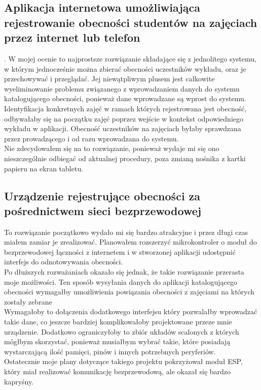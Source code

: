 \documentclass[declaration,shortabstract, mgr]{iithesis}
\begin{document}
\subsection{Aplikacja internetowa umożliwiająca rejestrowanie obecności studentów na zajęciach przez internet lub telefon}. 
\indent W mojej ocenie to najprostsze rozwiązanie składające się z jednolitego systemu, w którym jednocześnie można zbierać obecności uczestników wykładu, oraz je przechowywać i przeglądać. Jej niewątpliwym plusem jest całkowite wyeliminowanie problemu związanego z wprowadzaniem danych do systemu katalogującego obecności, ponieważ dane wprowadzane są wprost do systemu. Identyfikacja konkretnych zajęć w ramach których rejestrowana jest obecność, odbywałaby się na początku zajęć poprzez wejście w kontekst odpowiedniego wykładu w aplikacji. Obecność uczestników na zajęciach byłaby sprawdzana przez prowadzącego i od razu wprowadzana do systemu. \\
\indent Nie zdecydowałem się na to rozwiązanie, ponieważ wydaje mi się ono nieszczególnie odbiegać od aktualnej procedury, poza zmianą nośnika z kartki papieru na ekran tabletu.

\subsection{Urządzenie rejestrujące obecności za pośrednictwem sieci bezprzewodowej}
\indent To rozwiązanie początkowo wydało mi się bardzo atrakcyjne i przez długi czas miałem zamiar je zrealizować. Planowałem rozszerzyć mikrokontroler o moduł do bezprzewodowej łączności z internetem i w stworzonej aplikacji udostępnić interfejs do odnotowywania obecności. \\
\indent Po dłuższych rozważaniach okazało się jednak, że takie rozwiązanie przerasta moje możliwości. Ten sposób wysyłania danych do aplikacji katalogującego obecności wymagałby umożliwienia powiązania obecności z zajęciami na których zostały zebrane \\
\indent Wymagałoby to dołączenia dodatkowego interfejsu który pozwalałby wprowadzać takie dane, co jeszcze bardziej komplikowałoby projektowane przeze mnie urządzenie. Dodatkowo ograniczyłoby to zbiór układów scalonych z których mógłbym skorzystać, ponieważ musiałbym wybrać takie, które posiadają wystarczającą ilość pamięci, pinów i innych potrzebnych peryferiów. \\
\indent Ostatecznie moje plany dotyczące takiego projektu pokrzyżował moduł ESP, który miał realizować komunikację bezprzewodową, ale okazał się bardzo kapryśny.
\end{document}
